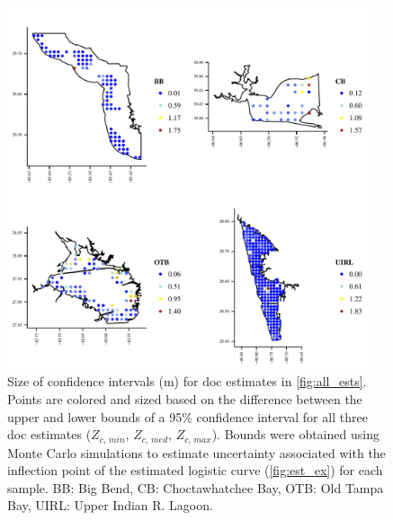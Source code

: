 \documentclass[letterpaper,12pt,oneside]{article}\usepackage[]{graphicx}\usepackage[]{color}
\begin{document}
\begin{figure}
\centering
\includegraphics[width = 0.95\textwidth]{figs/all_sens.pdf}
\caption{Size of confidence intervals (m) for \acl{doc} estimates in \cref{fig:all_ests}.  Points are colored and sized based on the difference between the upper and lower bounds of a 95\% confidence interval for all three \ac{doc} estimates ($Z_{c,\,min}$, $Z_{c,\,med}$, $Z_{c,\,max}$). Bounds were obtained using Monte Carlo simulations to estimate uncertainty associated with the inflection point of the estimated logistic curve (\cref{fig:est_ex}) for each sample. BB: Big Bend, CB: Choctawhatchee Bay, OTB: Old Tampa Bay, UIRL: Upper Indian R. Lagoon.}
\label{fig:all_sens}
\end{figure}

\end{document}
